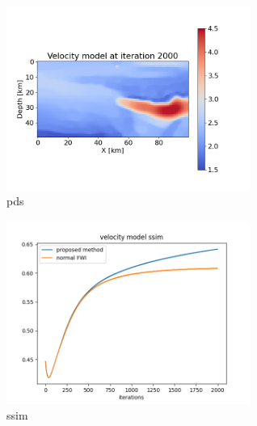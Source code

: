 \begin{figure}[htbp]\label{fig:pds_velocity_model}
\vspace{-\baselineskip}
\begin{center}
    \includegraphics[width=80mm]{public/pds}
    \caption{pds}
\end{center}
\vspace{-\baselineskip}
\end{figure}

\begin{figure}[htbp]\label{fig:ssim}
\vspace{-\baselineskip}
\begin{center}
    \includegraphics[width=80mm]{public/ssim}
    \caption{ssim}
\end{center}
\vspace{-\baselineskip}
\end{figure}
